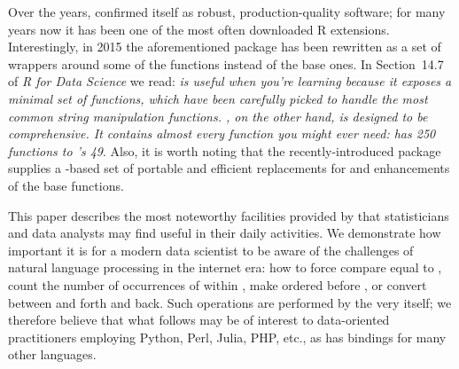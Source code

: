 \documentclass[nojss]{jss}
\begin{document}
Over the years,  confirmed itself as robust,
production-quality software; for many years now it has been one of the
most often downloaded R extensions. Interestingly, in 2015 the
aforementioned  package has been rewritten as a
set of wrappers around some of the  functions instead of
the base  ones.
In Section~14.7 of \textit{R for Data Science}
\citep{GrolemundWickham2017:rdatascience}
we read: \textit{ is useful when you're learning because
it exposes a minimal set of functions, which have been carefully picked
to handle the most common string manipulation functions. ,
on the other hand, is designed to be comprehensive. It contains almost
every function you might ever need:  has 250 functions to
's 49}.
Also, it is worth noting that the recently-introduced 
package \citep{stringx} supplies a -based set of portable
and efficient replacements for and enhancements of the base 
functions.



\bigskip
This paper describes the most noteworthy facilities provided by
 that statisticians and data analysts may find
useful in their daily activities. We demonstrate how important it is
for a modern data scientist to be aware of the challenges
of natural language processing in the internet era:
how to force  compare equal to ,
count the number of occurrences of  within
,
make  ordered before , or
convert between  and  forth and back.
Such operations are performed by the very  itself;
we therefore believe that what follows may be of interest
to data-oriented practitioners employing Python, Perl, Julia, PHP, etc.,
as  has bindings for many other languages.
\end{document}
